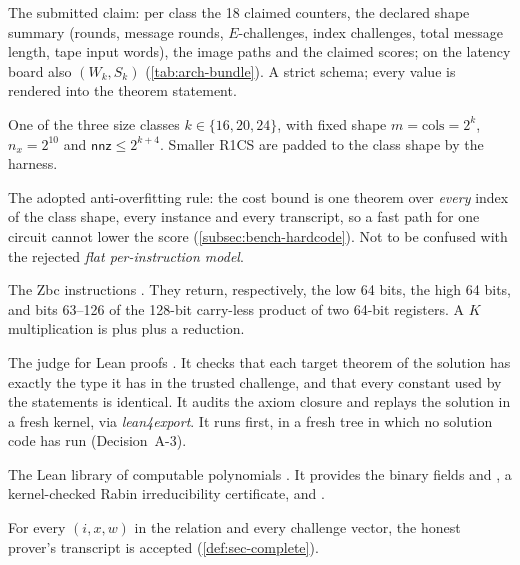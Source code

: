 \begin{description}[leftmargin=0pt,itemsep=2pt,parsep=0pt,font=\normalfont\bfseries]
\item[claim.json.] The submitted claim: per class the 18 claimed counters, the declared shape
  summary (rounds, message rounds, $E$-challenges, index challenges, total message length, tape
  input words), the image paths and the claimed scores; on the latency board also $(W_k,S_k)$
  (\cref{tab:arch-bundle}). A strict schema; every value is rendered into the theorem statement.

\item[Class.] One of the three size classes $k\in\{16,20,24\}$, with fixed shape $m=\mathrm{cols}=2^k$,
  $n_x=2^{10}$ and $\mathsf{nnz}\le2^{k+4}$. Smaller R1CS are padded to the class shape by the
  harness.

\item[Class-uniform cost theorem.] The adopted anti-overfitting rule: the cost bound is one
  theorem over \emph{every} index of the class shape, every instance and every transcript, so a
  fast path for one circuit cannot lower the score (\cref{subsec:bench-hardcode}). Not to be
  confused with the rejected \emph{flat per-instruction model}.

\item[clmul, clmulh, clmulr.] The Zbc instructions \cite{RISCV-Bitmanip}. They return,
  respectively, the low 64 bits, the high 64 bits, and bits 63--126 of the 128-bit carry-less
  product of two 64-bit registers. A $K$ multiplication is  plus  plus a
  reduction.

\item[Comparator.] The judge for Lean proofs \cite{comparator}. It checks that each target theorem
  of the solution has exactly the type it has in the trusted challenge, and that every constant used
  by the statements is identical. It audits the axiom closure and replays the solution in a fresh
  kernel, via \emph{lean4export}. It runs first, in a fresh tree in which no solution code has run
  (Decision~A-3).

\item[CompPoly.] The Lean library of computable polynomials \cite{comppoly2026}. It provides the
  binary fields  and , a kernel-checked Rabin irreducibility
  certificate, and .

\item[Completeness (perfect).] For every $(i,x,w)$ in the relation and every challenge vector, the
  honest prover's transcript is accepted (\cref{def:sec-complete}).


\end{description}
